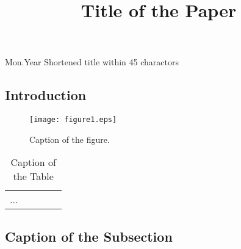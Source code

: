 \documentclass[12pt,twoside]{article}
\begin{document}
\setcounter{page}{1}

\setpageinformation
{}
{ }{ }{}{Mon.}{Year}
{Shortened title within 45 charactors}

\begin{CJK}{GBK}{song}

\title{Title of the Paper}



\begin{abstract}
\end{abstract}


\begin{multicols}{2}
\normalsize
\section{Introduction}

\begin{figure}
\footnotesize\centering
\centerline{\texttt{[image: figure1.eps]}}
\caption{Caption of the figure.}
\end{figure}

\begin{table}
\caption{Caption of the Table}
\centering
\begin{tabular}{ccccc}
...
\end{tabular}
\end{table}

\subsection{Caption of the Subsection}




\begin{thebibliography}{00}


\end{thebibliography}



\end{multicols}
\end{CJK}
\end{document}
